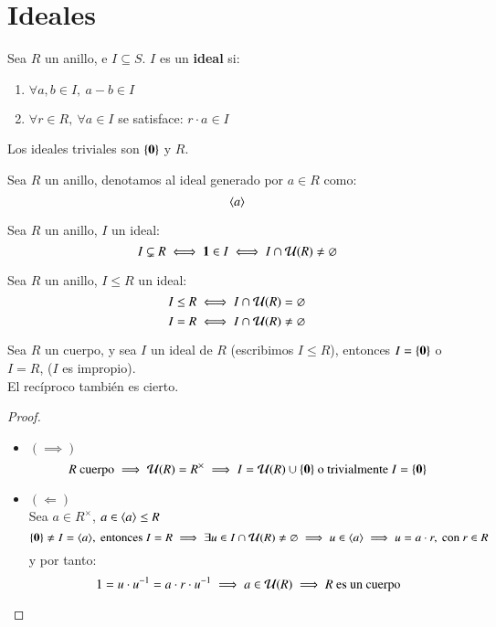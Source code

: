 \section{Ideales}

\begin{dfn}[Ideal]
    Sea $R$ un anillo, e $I \subseteq S$. $I$ es un \textbf{ideal} si:
    \begin{enumerate}
        \item $\forall a, b \in I,\ a - b \in I$
        \item $\forall r \in R,\ \forall a \in I$ se satisface: $r\cdot a \in I$
    \end{enumerate}
    Los ideales triviales son $\{\mathbf{0}\}$ y $R$.
\end{dfn}

\begin{obs}
    Sea $R$ un anillo, denotamos al ideal generado por $a \in R$ como:
    $$
        \langle a\rangle
    $$
\end{obs}

\begin{pro}
    Sea $R$ un anillo, $I$ un ideal:
    $$
        I \subsetneq R \iff \mathbf{1} \in I \iff I \cap \mathcal{U}(R) \neq \varnothing
    $$
\end{pro}

\begin{obs}
    Sea $R$ un anillo, $I \leq R$ un ideal:
    $$
        I \leq R \iff I \cap \mathcal{U}(R) = \varnothing
    $$
    $$
        I = R \iff I \cap \mathcal{U}(R) \neq \varnothing
    $$
\end{obs}


\begin{pro}
    Sea $R$ un cuerpo, y sea $I$ un ideal de $R$ (escribimos $I \leq R$), entonces $I = \{\mathbf{0}\}$ o $I = R$, ($I$ es impropio).\\
    El recíproco también es cierto.
\end{pro}

\begin{proof}$ $
    \begin{itemize}
        \item $\left( \implies \right)$
        $$
            R \text{ cuerpo} \implies \mathcal{U}(R) = R^{\times} \implies I = \mathcal{U}(R) \cup \{\mathbf{0}\} \text{ o trivialmente } I = \{\mathbf{0}\}
        $$
        \item $\left( \Longleftarrow \right)$\\
        Sea $a \in R^{\times}$, $a \in \langle a\rangle \leq R$
        $$
            \{\mathbf{0}\} \neq I = \langle a\rangle,\text{ entonces } I = R \implies \exists u \in I \cap \mathcal{U}(R) \neq \varnothing \implies u \in \langle a\rangle \implies u = a\cdot r, \text{ con } r \in R
        $$
        y por tanto:
        $$
            1 = u \cdot u^{-1} = a \cdot r \cdot u^{-1} \implies a \in \mathcal{U}(R) \implies R \text{ es un cuerpo}
        $$
    \end{itemize}
\end{proof}

